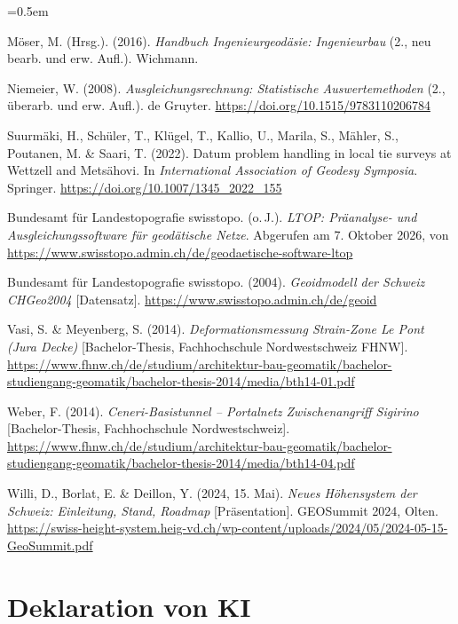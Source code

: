 \begin{list}{}{\leftmargin=1.27cm \itemindent=-1.27cm \itemsep=0.5em}
\item Möser, M. (Hrsg.). (2016). \textit{Handbuch Ingenieurgeodäsie: Ingenieurbau} (2., neu bearb. und erw. Aufl.). Wichmann.

\item Niemeier, W. (2008). \textit{Ausgleichungsrechnung: Statistische Auswertemethoden} (2., überarb. und erw. Aufl.). de Gruyter. \url{https://doi.org/10.1515/9783110206784}

\item Suurmäki, H., Schüler, T., Klügel, T., Kallio, U., Marila, S., Mähler, S., Poutanen, M. \& Saari, T. (2022). Datum problem handling in local tie surveys at Wettzell and Metsähovi. In \textit{International Association of Geodesy Symposia}. Springer. \url{https://doi.org/10.1007/1345_2022_155}

\item Bundesamt für Landestopografie swisstopo. (o.\,J.). \textit{LTOP: Präanalyse- und Ausgleichungssoftware für geodätische Netze}. Abgerufen am 7. Oktober 2026, von \url{https://www.swisstopo.admin.ch/de/geodaetische-software-ltop}

\item Bundesamt für Landestopografie swisstopo. (2004). \textit{Geoidmodell der Schweiz CHGeo2004} [Datensatz]. \url{https://www.swisstopo.admin.ch/de/geoid}

\item Vasi, S. \& Meyenberg, S. (2014). \textit{Deformationsmessung Strain-Zone Le Pont (Jura Decke)} [Bachelor-Thesis, Fachhochschule Nordwestschweiz FHNW]. \url{https://www.fhnw.ch/de/studium/architektur-bau-geomatik/bachelor-studiengang-geomatik/bachelor-thesis-2014/media/bth14-01.pdf}

\item Weber, F. (2014). \textit{Ceneri-Basistunnel -- Portalnetz Zwischenangriff Sigirino} [Bachelor-Thesis, Fachhochschule Nordwestschweiz]. \url{https://www.fhnw.ch/de/studium/architektur-bau-geomatik/bachelor-studiengang-geomatik/bachelor-thesis-2014/media/bth14-04.pdf}

\item Willi, D., Borlat, E. \& Deillon, Y. (2024, 15. Mai). \textit{Neues Höhensystem der Schweiz: Einleitung, Stand, Roadmap} [Präsentation]. GEOSummit 2024, Olten. \url{https://swiss-height-system.heig-vd.ch/wp-content/uploads/2024/05/2024-05-15-GeoSummit.pdf}

\end{list}

\section{Deklaration von KI}
\label{Deklaration von KI}

